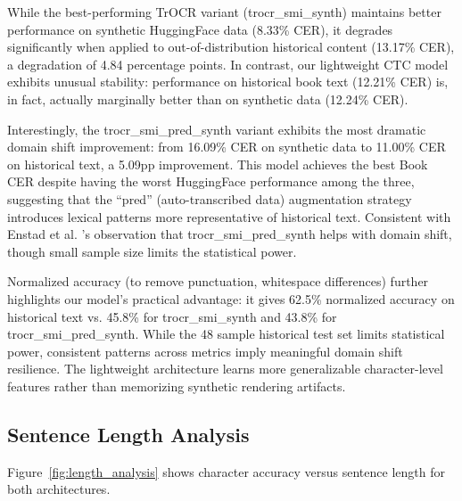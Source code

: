 \documentclass[conference]{IEEEtran}
\newcommand{\ctcCER}{12.24}
\newcommand{\bookTestSamples}{48}
\newcommand{\ctcBookCER}{12.21}
\newcommand{\trocrSynthHFCER}{8.33}
\newcommand{\trocrSynthBookCER}{13.17}
\newcommand{\trocrSynthDeltaCER}{4.84}
\newcommand{\trocrSynthBookNormAcc}{45.8}
\newcommand{\ctcBookNormAcc}{62.5}
\newcommand{\trocrPredSynthHFCER}{16.09}
\newcommand{\trocrPredSynthBookCER}{11.00}
\newcommand{\trocrPredSynthDeltaCER}{5.09}
\newcommand{\trocrPredSynthBookNormAcc}{43.8}
\begin{document}
While the best-performing TrOCR variant (trocr\_smi\_synth) maintains better performance on synthetic HuggingFace data (\trocrSynthHFCER\% CER), it degrades significantly when applied to out-of-distribution historical content (\trocrSynthBookCER\% CER), a degradation of \trocrSynthDeltaCER{} percentage points. In contrast, our lightweight CTC model exhibits unusual stability: performance on historical book text (\ctcBookCER\% CER) is, in fact, actually marginally better than on synthetic data (\ctcCER\% CER). 

Interestingly, the trocr\_smi\_pred\_synth variant exhibits the most dramatic domain shift improvement: from \trocrPredSynthHFCER\% CER on synthetic data to \trocrPredSynthBookCER\% CER on historical text, a \trocrPredSynthDeltaCER{}pp improvement. This model achieves the best Book CER despite having the worst HuggingFace performance among the three, suggesting that the ``pred'' (auto-transcribed data) augmentation strategy introduces lexical patterns more representative of historical text. 
Consistent with Enstad et al. \cite{enstad2025}'s observation that trocr\_smi\_pred\_synth helps with domain shift, though small sample size limits the statistical power. 

Normalized accuracy (to remove punctuation, whitespace differences) further highlights our model's practical advantage: it gives \ctcBookNormAcc\% normalized accuracy on historical text vs. \trocrSynthBookNormAcc\% for trocr\_smi\_synth and \trocrPredSynthBookNormAcc\% for trocr\_smi\_pred\_synth. While the \bookTestSamples{} sample historical test set limits statistical power, consistent patterns across metrics imply meaningful domain shift resilience. The lightweight architecture learns more generalizable character-level features rather than memorizing synthetic rendering artifacts.


\subsection{Sentence Length Analysis}
\label{subsec:length_analysis}

Figure~\ref{fig:length_analysis} shows character accuracy versus sentence length for both architectures.
\end{document}

